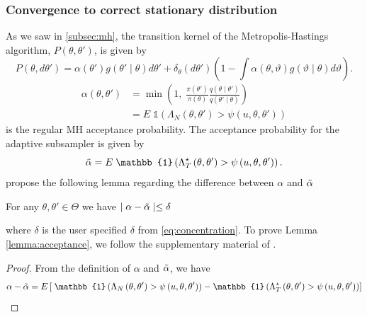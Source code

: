 { \subsubsection{Convergence to correct stationary distribution}
 As we saw in \ref{subsec:mh}, the transition kernel of the Metropolis-Hastings algorithm,
 $P(\theta, \theta')$, is given by
 \begin{equation*}
     P\left(\theta, d\theta'\right) = \alpha\left(\theta'\right)g\left(\theta'\mid\theta\right)d\theta' + \delta_{\theta}\left(d\theta'\right)\left(1 - \int\alpha\left(\theta, \vartheta\right)g\left(\vartheta\mid\theta\right) d\vartheta\right). 
 \end{equation*}
\begin{equation*}
\begin{split}
     \alpha\left(\theta, \theta'\right) &= \min\left(1,\; \frac{\pi\left(\theta'\right)}{\pi\left(\theta\right)}\frac{q\left(\theta\mid\theta'\right)}{q\left(\theta'\mid\theta\right)} \right) \\
     & = E \;\mathbb{1} \left(\Lambda_N\left(\theta, \theta'\right)> \psi \left(u, \theta, \theta' \right)\right)
\end{split}     
\end{equation*}
is the regular MH acceptance probability. The acceptance probability for the adaptive subsampler is given by 
\begin{equation}\label{eq:approx_accept}
    \Tilde{\alpha} = E \; \mathbb{1} \left(\Lambda_T^{\star}\left(\theta, \theta'\right) > \psi\left(u, \theta, \theta'\right)\right). 
\end{equation} 
\cite{Bardenet:2} propose the following lemma regarding the difference between $\alpha$ and $\Tilde{\alpha}$
\begin{lemma}\label{lemma:acceptance}
For any $\theta, \theta' \in \Theta$ we have $\mid \alpha - \Tilde{\alpha} \mid \leq \delta$
\end{lemma}
where $\delta$ is the user specified $\delta$ from \eqref{eq:concentration}. To prove Lemma \ref{lemma:acceptance}, we follow the supplementary material of \cite{Bardenet:2}. 
\begin{proof} From the definition of $\alpha$ and $\Tilde{\alpha}$, we have 
\begin{equation*}
\alpha - \Tilde{\alpha} = E\left[\; \mathbb{1}\left(\Lambda_N\left(\theta, \theta'\right) > \psi\left(u, \theta, \theta'\right)\right) - \mathbb{1}\left(\Lambda_T^{\star}\left(\theta, \theta'\right) > \psi\left(u, \theta, \theta'\right)\right)\right]    

\end{equation*}
\end{proof}}
